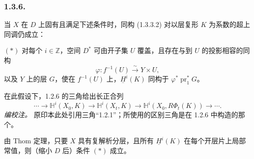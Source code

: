\subsubsection*{1.3.6.}
当 $X$ 在 $D$ 上固有且满足下述条件时，同构 (1.3.3.2) 对以层复形 $K$ 为系数的超上同调仍成立：

\medskip
\noindent $(*)$ 对每个 $i\in\mathbb Z$，空间 $D^*$ 可由开子集 $U$ 覆盖，且存在与到 $U$ 的投影相容的同构
\[
\varphi:f^{-1}(U)\xrightarrow{\ \sim\ }Y\times U,
\]
以及 $Y$ 上的层 $G$，使在 $f^{-1}(U)$ 上，$\underline H^i(K)$ 同构于 $\varphi^*\operatorname{pr}_1^*G$。

在此假设下，1.2.6 的三角给出长正合列
\begin{equation}\tag{1.3.6.1}
\cdots\longrightarrow
\mathbb H^i(X_0,K)\longrightarrow
\mathbb H^i(X_t,K)\longrightarrow
\mathbb H^i(X_0,R\Phi_t(K))\longrightarrow\cdots.
\end{equation}
\noindent\emph{编校注。} 原印本此处引用三角“1.2.1”；所使用的区别三角是在 1.2.6 中构造的那个。

由 Thom 定理，只要 $X$ 具有复解析分层，且所有 $\underline H^i(K)$ 在每个开层片上局部常值，则（缩小 $D$ 后）条件 $(*)$ 成立。

